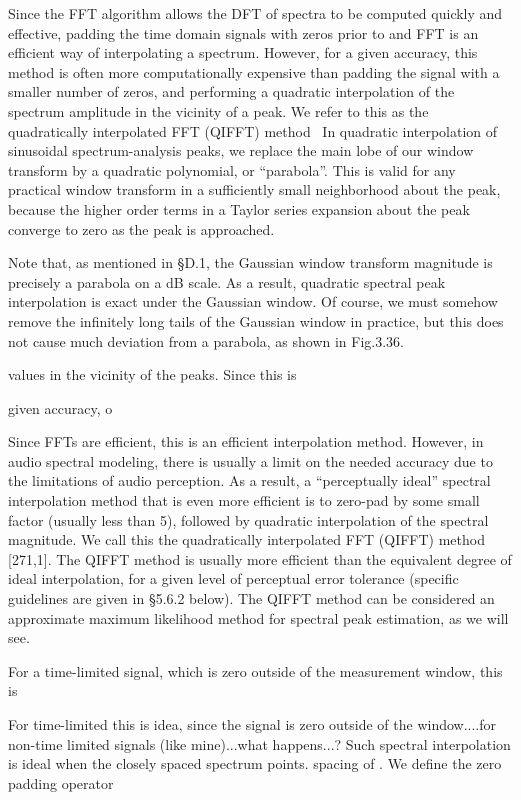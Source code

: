 Since the FFT algorithm allows the DFT of spectra to be computed quickly and
effective, padding the time domain signals with zeros prior to and FFT is an
efficient way of interpolating a spectrum. However, for a given accuracy, this
method is often more computationally expensive than padding the signal with a
smaller number of zeros, and performing a quadratic interpolation of the
spectrum amplitude in the vicinity of a peak. We refer to this as the
quadratically interpolated FFT (QIFFT) method~\cite{}
In quadratic interpolation of sinusoidal spectrum-analysis peaks, we replace the main lobe of our window transform by a quadratic polynomial, or ``parabola''. This is valid for any practical window transform in a sufficiently small neighborhood about the peak, because the higher order terms in a Taylor series expansion about the peak converge to zero as the peak is approached.

Note that, as mentioned in §D.1, the Gaussian window transform magnitude is precisely a parabola on a dB scale. As a result, quadratic spectral peak interpolation is exact under the Gaussian window. Of course, we must somehow remove the infinitely long tails of the Gaussian window in practice, but this does not cause much deviation from a parabola, as shown in Fig.3.36.

values in the vicinity of the peaks. Since this is 

given accuracy, o

Since FFTs are efficient, this is an efficient interpolation method.
However, in audio spectral modeling, there is usually a limit on the needed
accuracy due to the limitations of audio perception.
As a result, a ``perceptually ideal'' spectral interpolation method that is even more efficient is to zero-pad by some small factor (usually less than 5), followed by quadratic interpolation of the spectral magnitude. We call this the quadratically interpolated FFT (QIFFT) method [271,1]. The QIFFT method is usually more efficient than the equivalent degree of ideal interpolation, for a given level of perceptual error tolerance (specific guidelines are given in §5.6.2 below). The QIFFT method can be considered an approximate maximum likelihood method for spectral peak estimation, as we will see.

For a time-limited signal, which is zero outside of the measurement window, this
is


For time-limited this is idea, since the signal is zero outside of the
window....for non-time limited signals (like mine)...what happens...? Such
spectral interpolation is ideal when the closely spaced spectrum points. spacing
of . We define the zero padding operator



